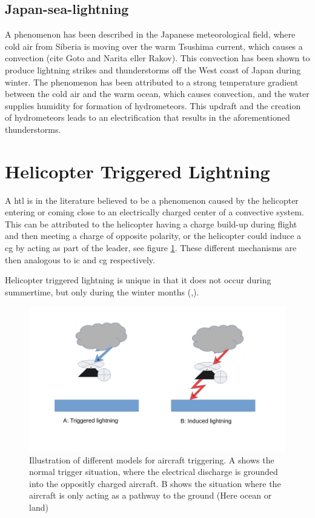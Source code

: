 \subsection{Japan-sea-lightning}
A phenomenon has been described in the Japanese meteorological field, where cold air from Siberia is moving over the warm Tsushima current, which causes a convection (cite Goto and Narita eller Rakov). This convection has been shown to produce lightning strikes and thunderstorms off the West coast of Japan during winter. The phenomenon has been attributed to a strong temperature gradient between the cold air and the warm ocean, which causes convection, and the water supplies humidity for formation of hydrometeors. This updraft and the creation of hydrometeors leads to an electrification that results in the aforementioned thunderstorms. 
 
\section{Helicopter Triggered Lightning}
A \acrshort{htl} is in the literature believed to be a phenomenon caused by the helicopter entering or coming close to an electrically charged center of a convective system. This can be attributed to the helicopter having a charge build-up during flight and then meeting a charge of opposite polarity, or the helicopter could induce a \acrshort{cg} by acting as part of the leader, see figure \ref{fig:triggertyper}. These different mechanisms are then analogous to \acrshort{ic} and \acrshort{cg} respectively. 

Helicopter triggered lightning is unique in that it does not occur during summertime, but only during the winter months (\cite{lande},\cite{wilkinson}). 

\begin{figure}
    \centering
    \includegraphics[width=\textwidth]{Figures/triggertyper.pdf}
    \caption{Illustration of different models for aircraft triggering. A shows the normal trigger situation, where the electrical discharge is grounded into the oppositly charged aircraft. B shows the situation where the aircraft is only acting as a pathway to the ground (Here ocean or land)}
    \label{fig:triggertyper}
\end{figure}

